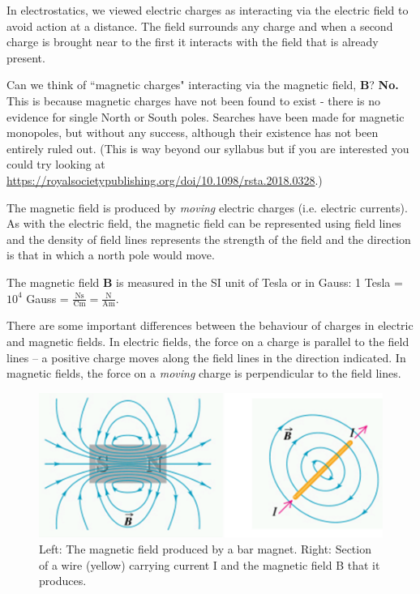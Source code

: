 \documentclass[
]{book}
\begin{document}
In electrostatics, we viewed electric charges as interacting via the
electric field to avoid action at a distance. The field surrounds any
charge and when a second charge is brought near to the first it
interacts with the field that is already present.

Can we think of ``magnetic charges" interacting via the magnetic field,
\(\mathbf{B}\)? \textbf{No.} This is because magnetic charges have not been found to
exist - there is no evidence for single North or South poles. Searches
have been made for magnetic monopoles, but without any success, although
their existence has not been entirely ruled out. (This is way beyond our
syllabus but if you are interested you could try looking at
\url{https://royalsocietypublishing.org/doi/10.1098/rsta.2018.0328}.)

The magnetic field is produced by \emph{moving} electric charges (i.e.
electric currents). As with the electric field, the magnetic field can
be represented using field lines and the density of field lines
represents the strength of the field and the direction is that in which
a north pole would move.

The magnetic field \(\mathbf{B}\) is measured in the SI unit of Tesla or in Gauss:
1 Tesla = \(10^4\) Gauss =
\(\frac{\mathrm{Ns}}{\mathrm{Cm}} = \frac{\mathrm{N}}{\mathrm{Am}}\).

There are some important differences between the behaviour of charges in
electric and magnetic fields. In electric fields, the force on a charge
is parallel to the field lines -- a positive charge moves along the
field lines in the direction indicated. In magnetic fields, the force on
a \emph{moving} charge is perpendicular to the field lines.

\begin{figure}

{\centering \includegraphics[width=0.7\linewidth]{Figures/MagFields} 

}

\caption{Left: The magnetic field produced by a bar magnet. Right: Section of a wire (yellow) carrying current I and the magnetic field B that it produces.}\label{fig:MagFields}
\end{figure}
\end{document}

